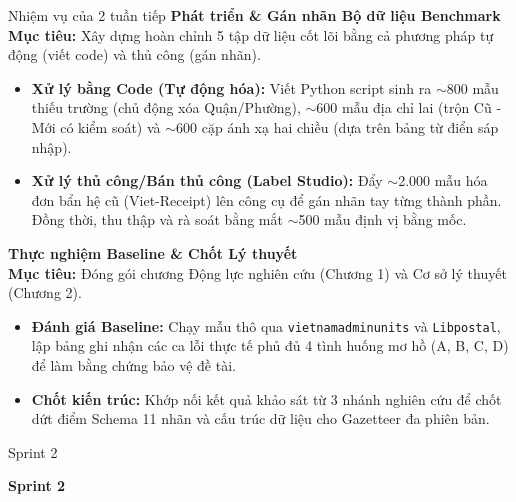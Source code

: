 \documentclass[aspectratio=169,9pt]{beamer}
\begin{document}
\begin{frame}{Nhiệm vụ của 2 tuần tiếp}
  \small
  \textbf{\normalsize Phát triển \& Gán nhãn Bộ dữ liệu Benchmark}\\[0.03cm]
  \textbf{Mục tiêu:} Xây dựng hoàn chỉnh 5 tập dữ liệu cốt lõi bằng cả phương pháp tự động (viết code) và thủ công (gán nhãn).
  \begin{itemize}
    \setlength{\itemsep}{1.5pt}
    \item \textbf{Xử lý bằng Code (Tự động hóa):} Viết Python script sinh ra $\sim$800 mẫu thiếu trường (chủ động xóa Quận/Phường), $\sim$600 mẫu địa chỉ lai (trộn Cũ - Mới có kiểm soát) và $\sim$600 cặp ánh xạ hai chiều (dựa trên bảng từ điển sáp nhập).
    \item \textbf{Xử lý thủ công/Bán thủ công (Label Studio):} Đẩy $\sim$2.000 mẫu hóa đơn bẩn hệ cũ (Viet-Receipt) lên công cụ để gán nhãn tay từng thành phần. Đồng thời, thu thập và rà soát bằng mắt $\sim$500 mẫu định vị bằng mốc.
  \end{itemize}

  \vspace{0.15cm}
  \textbf{\normalsize Thực nghiệm Baseline \& Chốt Lý thuyết}\\[0.03cm]
  \textbf{Mục tiêu:} Đóng gói chương Động lực nghiên cứu (Chương 1) và Cơ sở lý thuyết (Chương 2).
  \begin{itemize}
    \setlength{\itemsep}{1.5pt}
    \item \textbf{Đánh giá Baseline:} Chạy mẫu thô qua \texttt{vietnamadminunits} và \texttt{Libpostal}, lập bảng ghi nhận các ca lỗi thực tế phủ đủ 4 tình huống mơ hồ (A, B, C, D) để làm bằng chứng bảo vệ đề tài.
    \item \textbf{Chốt kiến trúc:} Khớp nối kết quả khảo sát từ 3 nhánh nghiên cứu để chốt dứt điểm Schema 11 nhãn và cấu trúc dữ liệu cho Gazetteer đa phiên bản.
  \end{itemize}
\end{frame}

\begin{frame}{Sprint 2}
  \vspace{1.5cm}
  \begin{center}
    {\titlefont\fontsize{24pt}{28pt}\selectfont\bfseries\color{bkblue} Sprint 2}
  \end{center}
\end{frame}
\end{document}
